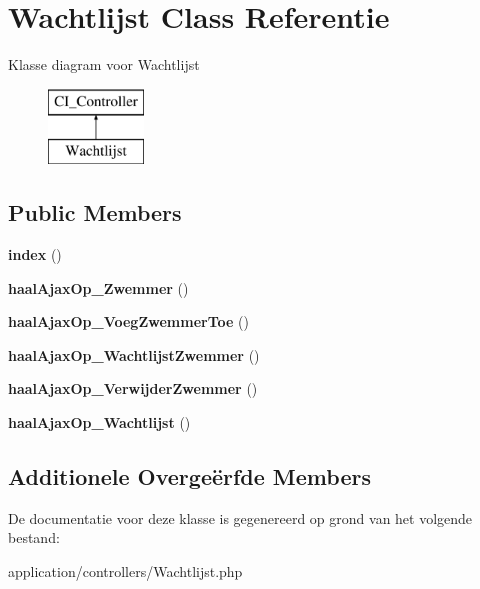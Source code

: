 \hypertarget{class_wachtlijst}{}\section{Wachtlijst Class Referentie}
\label{class_wachtlijst}
Klasse diagram voor Wachtlijst\begin{figure}[H]
\begin{center}
\leavevmode
\includegraphics[height=2.000000cm]{class_wachtlijst}
\end{center}
\end{figure}
\subsection*{Public Members}
\begin{DoxyCompactItemize}
\item 
\mbox{\label{class_wachtlijst_a149eb92716c1084a935e04a8d95f7347}} 
{\bfseries index} ()
\item 
\mbox{\label{class_wachtlijst_ad8b812adf8e57e4dafb8d316cad408f7}} 
{\bfseries haal\+Ajax\+Op\+\_\+\+Zwemmer} ()
\item 
\mbox{\label{class_wachtlijst_a5889b8d93fccbbb82aaecd659199c0e6}} 
{\bfseries haal\+Ajax\+Op\+\_\+\+Voeg\+Zwemmer\+Toe} ()
\item 
\mbox{\label{class_wachtlijst_ac583638f687d8dfe32acc8caef37bf86}} 
{\bfseries haal\+Ajax\+Op\+\_\+\+Wachtlijst\+Zwemmer} ()
\item 
\mbox{\label{class_wachtlijst_a329599a2dcfd803ba9e64ade6436cba3}} 
{\bfseries haal\+Ajax\+Op\+\_\+\+Verwijder\+Zwemmer} ()
\item 
\mbox{\label{class_wachtlijst_a62410e6f2107e454da642250fda4066c}} 
{\bfseries haal\+Ajax\+Op\+\_\+\+Wachtlijst} ()
\end{DoxyCompactItemize}
\subsection*{Additionele Overge\"{e}rfde Members}


De documentatie voor deze klasse is gegenereerd op grond van het volgende bestand\+:\begin{DoxyCompactItemize}
\item 
application/controllers/Wachtlijst.\+php\end{DoxyCompactItemize}
